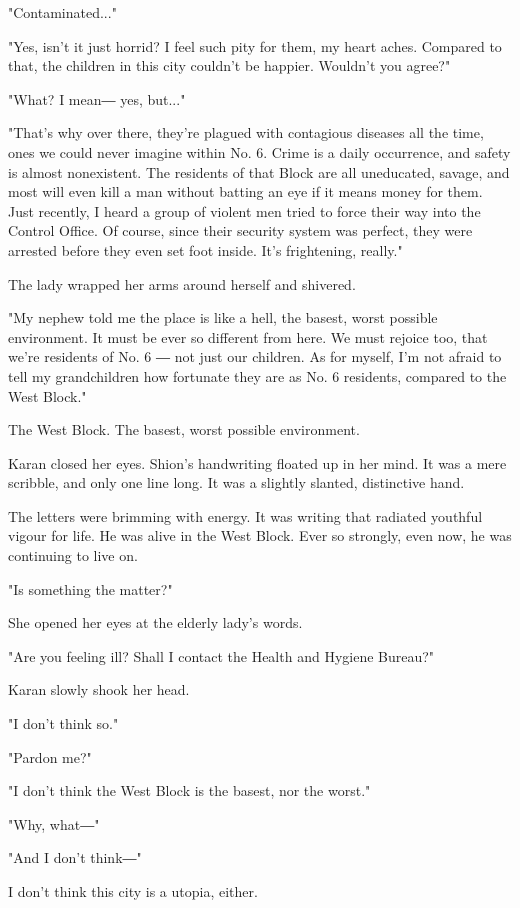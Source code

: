 "Contaminated..."

"Yes, isn't it just horrid? I feel such pity for them, my heart aches.
Compared to that, the children in this city couldn't be happier.
Wouldn't you agree?"

"What? I mean― yes, but..."

"That's why over there, they're plagued with contagious diseases all the
time, ones we could never imagine within No. 6. Crime is a daily
occurrence, and safety is almost nonexistent. The residents of that
Block are all uneducated, savage, and most will even kill a man without
batting an eye if it means money for them. Just recently, I heard a
group of violent men tried to force their way into the Control Office.
Of course, since their security system was perfect, they were arrested
before they even set foot inside. It's frightening, really."

The lady wrapped her arms around herself and shivered.

"My nephew told me the place is like a hell, the basest, worst possible
environment. It must be ever so different from here. We must rejoice
too, that we're residents of No. 6 ― not just our children. As for
myself, I'm not afraid to tell my grandchildren how fortunate they are
as No. 6 residents, compared to the West Block."

The West Block. The basest, worst possible environment.

Karan closed her eyes. Shion's handwriting floated up in her mind. It
was a mere scribble, and only one line long. It was a slightly slanted,
distinctive hand.

The letters were brimming with energy. It was writing that radiated
youthful vigour for life. He was alive in the West Block. Ever so
strongly, even now, he was continuing to live on.

"Is something the matter?"

She opened her eyes at the elderly lady's words.

"Are you feeling ill? Shall I contact the Health and Hygiene Bureau?"

Karan slowly shook her head.

"I don't think so."

"Pardon me?"

"I don't think the West Block is the basest, nor the worst."

"Why, what―"

"And I don't think―"

I don't think this city is a utopia, either.

